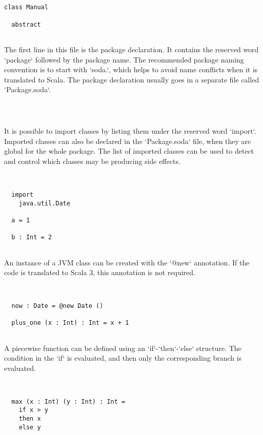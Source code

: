 \documentclass[12pt,a4paper]{article}
\begin{document}
\begin{lstlisting}


class Manual

  abstract


\end{lstlisting}

  The first line in this file is the package declaration. It contains the reserved word
   `package` followed by the package name. The recommended package naming convention is to
   start with `soda.`, which helps to avoid name conflicts when it is translated to Scala.
   The package declaration usually goes in a separate file called `Package.soda`.


\begin{lstlisting}



\end{lstlisting}

  It is possible to import classes by listing them under the reserved word `import`.
   Imported classes can also be declared in the `Package.soda` file, when they are global
   for the whole package. The list of imported classes can be used to detect and control which
   classes may be producing side effects.


\begin{lstlisting}


  import
    java.util.Date

  a = 1

  b : Int = 2


\end{lstlisting}

  An instance of a JVM class can be created with the `@new` annotation. If the code is
   translated to Scala 3, this annotation is not required.


\begin{lstlisting}


  now : Date = @new Date ()

  plus_one (x : Int) : Int = x + 1


\end{lstlisting}

  A piecewise function can be defined using an `if`-`then`-`else` structure. The condition in
   the `if` is evaluated, and then only the corresponding branch is evaluated.


\begin{lstlisting}


  max (x : Int) (y : Int) : Int =
    if x > y
    then x
    else y


\end{lstlisting}
\end{document}
